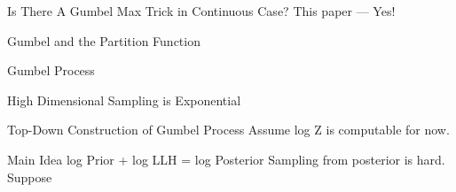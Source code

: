 \begin{frame}{Is There A Gumbel Max Trick in Continuous Case?}
  This paper --- Yes!
\end{frame}

\begin{frame}{Gumbel and the Partition Function}
  
\end{frame}

\begin{frame}{Gumbel Process}
\end{frame}

\begin{frame}{High Dimensional Sampling is Exponential}

\end{frame}

\begin{frame}{Top-Down Construction of Gumbel Process}
Assume log Z is computable for now.
\end{frame}

\begin{frame}{Main Idea}
  log Prior + log LLH = log Posterior
  Sampling from posterior is hard.
  Suppose 
\end{frame}
